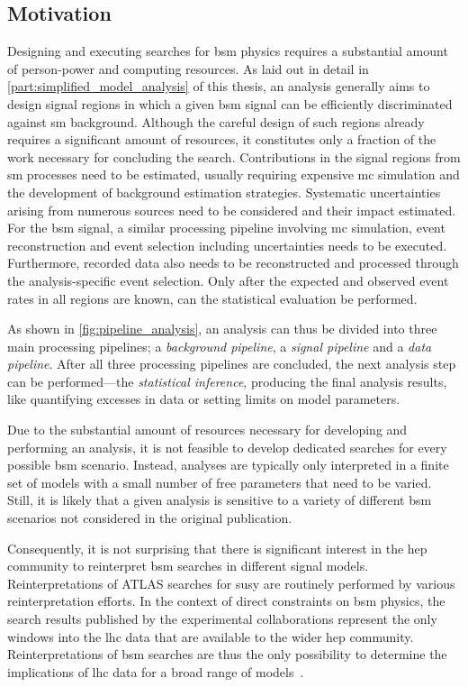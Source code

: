 \subsection{Motivation}
Designing and executing searches for \gls{bsm} physics requires a substantial amount of person-power and computing resources. As laid out in detail in \cref{part:simplified_model_analysis} of this thesis, an analysis generally aims to design signal regions in which a given \gls{bsm} signal can be efficiently discriminated against \gls{sm} background. Although the careful design of such regions already requires a significant amount of resources, it constitutes only a fraction of the work necessary for concluding the search. 
Contributions in the signal regions from \gls{sm} processes need to be estimated, usually requiring expensive \gls{mc} simulation and the development of background estimation strategies. Systematic uncertainties arising from numerous sources need to be considered and their impact estimated. 
For the \gls{bsm} signal, a similar processing pipeline involving \gls{mc} simulation, event reconstruction and event selection including uncertainties needs to be executed.
Furthermore, recorded data also needs to be reconstructed and processed through the analysis-specific event selection.
Only after the expected and observed event rates in all regions are known, can the statistical evaluation be performed. 

As shown in \cref{fig:pipeline_analysis}, an analysis can thus be divided into three main processing pipelines; a \textit{background pipeline}, a \textit{signal pipeline} and a \textit{data pipeline}.
After all three processing pipelines are concluded, the next analysis step can be performed---the \textit{statistical inference}, producing the final analysis results, like quantifying excesses in data or setting limits on model parameters.

Due to the substantial amount of resources necessary for developing and performing an analysis, it is not feasible to develop dedicated searches for every possible \gls{bsm} scenario.
Instead, analyses are typically only interpreted in a finite set of models with a small number of free parameters that need to be varied.
Still, it is likely that a given analysis is sensitive to a variety of different \gls{bsm} scenarios not considered in the original publication. 

Consequently, it is not surprising that there is significant interest in the \gls{hep} community to reinterpret \gls{bsm} searches in different signal models. Reinterpretations of ATLAS searches for \gls{susy} are routinely performed by various reinterpretation efforts. In the context of direct constraints on \gls{bsm} physics, the search results published by the experimental collaborations represent the only windows into the \gls{lhc} data that are available to the wider \gls{hep} community.
Reinterpretations of \gls{bsm} searches are thus the only possibility to determine the implications of \gls{lhc} data for a broad range of models~\cite{reinterpretation_workshop}.

